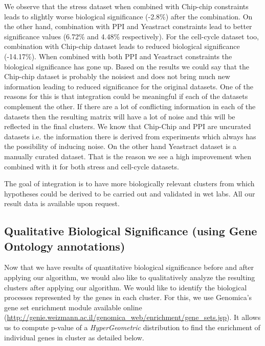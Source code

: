 We observe that the stress dataset when combined with Chip-chip constraints leads to 
slightly worse biological significance (-2.8\%) after the combination. On the other hand, combination with PPI and Yeastract constraints lead to better significance values (6.72\% and 4.48\% respectively). For 
the cell-cycle dataset too, combination with Chip-chip dataset leads to reduced biological significance (-14.17\%). When combined with both PPI and Yeastract constraints the biological significance 
has gone up. Based on the results we could say that the Chip-chip dataset is probably the noisiest and does not bring much new information leading to reduced significance for the original datasets. 
One of the reasons for this is that integration could be meaningful if each of the datasets complement the other. If there are 
a lot of conflicting information in each of the datasets then the resulting matrix will have a lot of noise and this will be reflected in the final clusters. We know that Chip-Chip and PPI are uncurated datasets i.e. the information there is derived from experiments which always has the possibility of inducing noise. On the other hand Yeastract 
dataset is a manually curated dataset. That is the reason we see a high improvement when combined with it for both stress and cell-cycle datasets. 
  
The goal of integration is to have more biologically relevant clusters from which hypotheses could be derived to be carried out and validated in wet labs. 
All our result data is available upon request. 

\subsection{Qualitative Biological Significance (using Gene Ontology annotations)} \label{semisup_biosig_go}
Now that we have results of quantitative biological significance before and after applying our algorithm, we would also like to qualitatively analyze the resulting clusters after 
applying our algorithm. We would like to identify the biological processes represented by the genes in each cluster. For this, we use Genomica's gene set enrichment module available online (\url{http://genie.weizmann.ac.il/genomica_web/enrichment/gene_sets.jsp}). It allows us to compute 
p-value of a \textit{HyperGeometric} distribution to find the enrichment of individual genes in cluster as detailed below.

